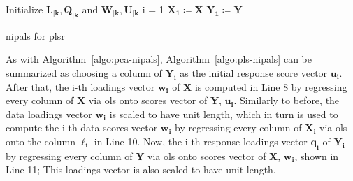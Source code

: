 \begin{algorithm}[H]
	\DontPrintSemicolon
	\label{algo:pls-nipals}
	\SetAlgoLined
	Initialize $\mathbf{L_{|k}, Q_{|k}}$ and $\mathbf{W_{|k}, U_{|k}}$\;
	i = 1\;
	$\mathbf{X_1 \coloneqq X}$\;
	$\mathbf{Y_1 \coloneqq Y}$\;
	
	\caption{\acrshort{nipals} for \acrfull{plsr}}
\end{algorithm}

As with Algorithm~\ref{algo:pca-nipals}, Algorithm~\ref{algo:pls-nipals} can be summarized as choosing a column of $\mathbf{Y_i}$ as the initial response score vector $\mathbf{u_i}$. After that, the i-th loadings vector $\mathbf{w_i}$  of $\mathbf{X}$ is computed in Line 8 by regressing every column of $\mathbf{X}$ via \acrshort{ols} onto scores vector of $\mathbf{Y}$, $\mathbf{u_i}$. Similarly to before, the data loadings vector $\mathbf{w_i}$ is scaled to have unit length, which in turn is used to compute the i-th data scores vector $\mathbf{w_i}$ by regressing every column of $\mathbf{X_i}$ via \acrshort{ols} onto the column $\mathbf{\ell_i}$ in Line 10. Now, the i-th response loadings vector $\mathbf{q_i}$  of $\mathbf{Y_i}$  by regressing every column of $\mathbf{Y}$ via \acrshort{ols} onto scores vector of $\mathbf{X}$, $\mathbf{w_i}$, shown in Line 11; This loadings vector is also scaled to have unit length. 

